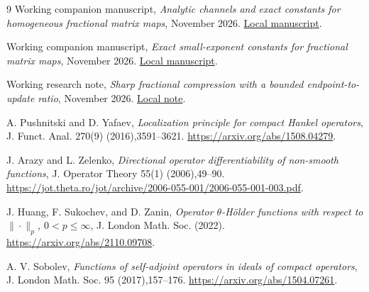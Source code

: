 \documentclass[11pt]{article}
\numberwithin{equation}{section}
\begin{document}
\begin{thebibliography}{9}
Working companion manuscript,
\emph{Analytic channels and exact constants for homogeneous fractional
matrix maps}, November 2026.
\href{fractional-channel-classification.pdf}{Local manuscript}.

Working companion manuscript,
\emph{Exact small-exponent constants for fractional matrix maps},
November 2026.
\href{sharp-fractional-holder.pdf}{Local manuscript}.

Working research note,
\emph{Sharp fractional compression with a bounded endpoint-to-update
ratio}, November 2026.
\href{bounded-spectrum-fractional-counts.txt}{Local note}.

A. Pushnitski and D. Yafaev,
\emph{Localization principle for compact Hankel operators},
J. Funct. Anal. 270(9) (2016),3591--3621.
\url{https://arxiv.org/abs/1508.04279}.

J. Arazy and L. Zelenko,
\emph{Directional operator differentiability of non-smooth functions},
J. Operator Theory 55(1) (2006),49--90.
\url{https://jot.theta.ro/jot/archive/2006-055-001/2006-055-001-003.pdf}.

J. Huang, F. Sukochev, and D. Zanin,
\emph{Operator $\theta$-H\"older functions with respect to
$\|\cdot\|_p$, $0<p\le\infty$},
J. London Math. Soc. (2022).
\url{https://arxiv.org/abs/2110.09708}.

A. V. Sobolev,
\emph{Functions of self-adjoint operators in ideals of compact operators},
J. London Math. Soc. 95 (2017),157--176.
\url{https://arxiv.org/abs/1504.07261}.
\end{thebibliography}
\end{document}
